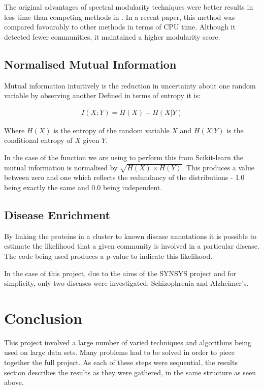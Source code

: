 The original advantages of spectral modularity techniques were better results in less time than competing methods in \textcite{newman_modularity_2006}.
In a recent paper, this method was compared favourably to other methods in terms of CPU time\autocite{mcleanunpub}.
Although it detected fewer communities, it maintained a higher modularity score.


\subsection{Normalised Mutual Information}

Mutual information intuitively is the reduction in uncertainty about one random variable by observing another
Defined in terms of entropy it is\autocite{mackay_information_2003}:

\begin{align}
    I(X;Y) = H(X) - H(X|Y)
\end{align}

Where $H(X)$ is the entropy of the random variable $X$ and $H(X|Y)$ is the conditional entropy of $X$ given $Y$.

In the case of the function we are using to perform this from Scikit-learn the mutual information is normalised by $\sqrt{H(X)\times H(Y)}$\autocite{pedregosa_scikit-learn:_2011}.
This produces a value between zero and one which reflects the redundancy of the distributions - 1.0 being exactly the same and 0.0 being independent.

\subsection{Disease Enrichment}
\label{diseaseenrichment}

By linking the proteins in a cluster to known disease annotations it is possible to estimate the likelihood that a given community is involved in a particular disease.
The code being used produces a p-value to indicate this likelihood.

In the case of this project, due to the aims of the SYNSYS project and for simplicity, only two diseases were investigated: Schizophrenia and Alzheimer's.



\section*{Conclusion}

This project involved a large number of varied techniques and algorithms being used on large data sets.
Many problems had to be solved in order to piece together the full project.
As each of these steps were sequential, the results section describes the results as they were gathered, in the same structure as seen above.
